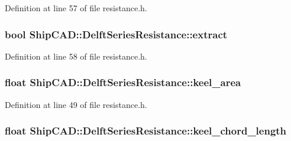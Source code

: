 Definition at line 57 of file resistance.\+h.

\subsubsection[{\texorpdfstring{extract}{extract}}]{\setlength{\rightskip}{0pt plus 5cm}bool Ship\+C\+A\+D\+::\+Delft\+Series\+Resistance\+::extract}\hypertarget{structShipCAD_1_1DelftSeriesResistance_a8276aa04952e727f1a310f10ceb72414}{}\label{structShipCAD_1_1DelftSeriesResistance_a8276aa04952e727f1a310f10ceb72414}


Definition at line 58 of file resistance.\+h.

\subsubsection[{\texorpdfstring{keel\+\_\+area}{keel_area}}]{\setlength{\rightskip}{0pt plus 5cm}float Ship\+C\+A\+D\+::\+Delft\+Series\+Resistance\+::keel\+\_\+area}\hypertarget{structShipCAD_1_1DelftSeriesResistance_ab1bf49519c2ed054b7699898d7f5aead}{}\label{structShipCAD_1_1DelftSeriesResistance_ab1bf49519c2ed054b7699898d7f5aead}


Definition at line 49 of file resistance.\+h.

\subsubsection[{\texorpdfstring{keel\+\_\+chord\+\_\+length}{keel_chord_length}}]{\setlength{\rightskip}{0pt plus 5cm}float Ship\+C\+A\+D\+::\+Delft\+Series\+Resistance\+::keel\+\_\+chord\+\_\+length}\hypertarget{structShipCAD_1_1DelftSeriesResistance_a986244b5c6944f01dbdae5d54b895c84}{}\label{structShipCAD_1_1DelftSeriesResistance_a986244b5c6944f01dbdae5d54b895c84}


